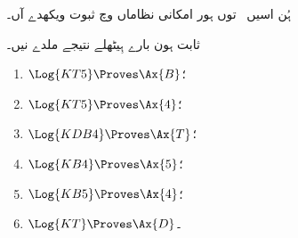 \documentclass[../../../include/open-logic-section]{subfiles}
\begin{document}


ہُن اسیں~ توں ہور امکانی نظاماں وچ ثبوت ویکھدے آں۔

\begin{prop}
ثابت ہون بارے ہِیٹھلے نتیجے ملدے نیں۔
  \begin{enumerate}
  \item $\Log{KT5} \Proves \Ax{B}$؛
  \item $\Log{KT5} \Proves \Ax{4}$؛
  \item $\Log{KDB4} \Proves \Ax{T}$؛
  \item $\Log{KB4} \Proves \Ax{5}$؛
  \item $\Log{KB5} \Proves \Ax{4}$؛
  \item {}$\Log{KT} \Proves \Ax{D}$۔
  \end{enumerate}
\end{prop}
\end{document}

